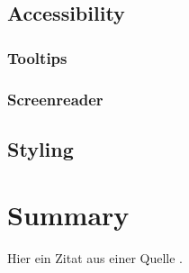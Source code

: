 \documentclass[a4paper,12pt]{report}
\begin{document}
\section{Accessibility}
\subsection{Tooltips}
\subsection{Screenreader}
\section{Styling}
\chapter{Summary}
\lipsum[1]

Hier ein Zitat aus einer Quelle \cite{author2023example}.



\printbibliography

\listoffigures
\newpage
\end{document}
